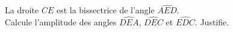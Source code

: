 %
%
La droite $CE$ est la bissectrice de l'angle $\widehat{AED}$.\\
    Calcule l'amplitude des angles $\widehat{DEA}$, $\widehat{DEC}$ et
    $\widehat{EDC}$. Justifie.
